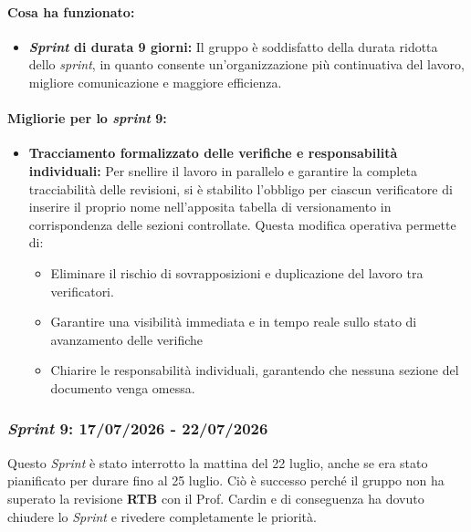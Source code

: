 \documentclass[12pt, a4paper]{article}
\begin{document}
{\paragraph{Cosa ha funzionato:}
\begin{itemize}
    \item \textbf{\textit{Sprint} di durata 9 giorni:} Il gruppo è soddisfatto della durata ridotta dello \textit{sprint}, in quanto consente un'organizzazione più continuativa del lavoro, migliore comunicazione e maggiore efficienza.
\end{itemize}


\paragraph{Migliorie per lo \textit{sprint} 9:}
\begin{itemize}
    \item \textbf{Tracciamento formalizzato delle verifiche e responsabilità individuali:} Per snellire il lavoro in parallelo e garantire la completa tracciabilità delle revisioni, si è stabilito l'obbligo per ciascun verificatore di inserire il proprio nome nell'apposita tabella di versionamento in corrispondenza delle sezioni controllate. Questa modifica operativa permette di:
    \begin{itemize}
        \item Eliminare il rischio di sovrapposizioni e duplicazione del lavoro tra verificatori.
        \item Garantire una visibilità immediata e in tempo reale sullo stato di avanzamento delle verifiche
        \item Chiarire le responsabilità individuali, garantendo che nessuna sezione del documento venga omessa.
    \end{itemize}
\end{itemize}



\subsubsection{\textit{Sprint} 9: 17/07/2026 - 22/07/2026}

Questo \textit{Sprint} è stato interrotto la mattina del 22 luglio, anche se era stato pianificato per durare fino al 25 luglio. Ciò è successo perché il gruppo non ha superato la revisione \textbf{RTB} con il Prof. Cardin e di conseguenza ha dovuto chiudere lo \textit{Sprint} e rivedere completamente le priorità.

}
\end{document}
